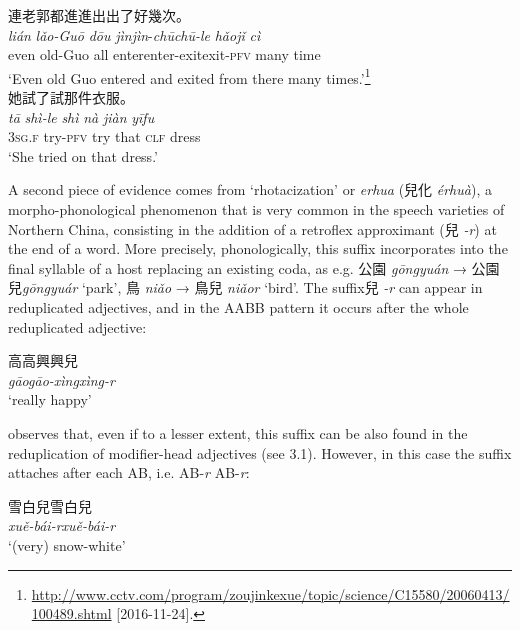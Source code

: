 \documentclass[output=paper]{langsci/langscibook}
\begin{document}
\ea\label{ex:BascianoMelloni:33}
\ea\label{ex:BascianoMelloni:33a} 連老郭都進進出出了好幾次。\\
\gll  \emph{lián} \emph{lǎo-Guō} \emph{dōu} \emph{jìn}\tld{}\emph{jìn}-\emph{chū}\tld{}\emph{chū-le} \emph{hǎojǐ} \emph{cì}\\
even old-Guo all enter\tld{}enter-exit\tld{}exit-\textsc{pfv} many time\\
\glt `Even old Guo entered and exited from there many times.'\footnote{\url{http://www.cctv.com/program/zoujinkexue/topic/science/C15580/20060413/100489.shtml} [2016-11-24].}\\
\ex\label{ex:BascianoMelloni:33b} 她試了試那件衣服。\\
\gll \emph{tā} \emph{shì-le} \emph{shì} \emph{nà} \emph{jiàn} \emph{yīfu }\\
3\textsc{sg.f} try-\textsc{pfv} try that \textsc{clf} dress\\
\glt `She tried on that dress.'\\
\z\z

A second piece of evidence comes from `rhotacization' or \emph{erhua}
(兒化 \emph{érhuà}), a mor\-pho-phonological phenomenon that is very
common in the speech varieties of Northern China, consisting in the
addition of a retroflex approximant (兒 \emph{-r}) at the end of a word.
More precisely, phonologically, this suffix incorporates into the final
syllable of a host  replacing an existing coda, as e.g. 公園
\emph{gōngyuán} → 公園兒\emph{gōngyuár} `park', 鳥 \emph{niǎo} → 鳥兒
\emph{niǎor} `bird'. The suffix兒 \emph{-r} can appear in reduplicated
adjectives, and in the AABB pattern it occurs after the whole
reduplicated adjective:

\vspace{\topsep}\ea\label{ex:BascianoMelloni:34}高高興興兒\\
\emph{gāo\tld{}gāo-xìng\tld{}xìng-r}\\
\glt `really happy'\\
\z


%
\citet{Lee-Kim2016} %
%
observes that, even if to a lesser extent, this suffix can
be also found in the reduplication of modifier-head adjectives (see
3.1). However, in this case the suffix attaches after each AB, i.e.
AB-\emph{r} AB-\emph{r}:

\ea\label{ex:BascianoMelloni:35}雪白兒雪白兒\\
\emph{xuě-bái-r\tld{}xuě-bái-r}\\
\glt `(very) snow-white'
\z
\end{document}
